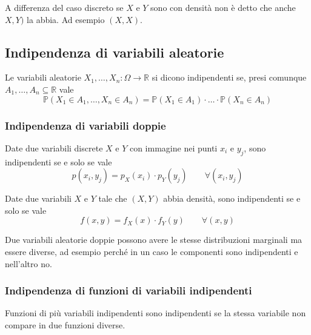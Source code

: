 \begin{observation}
	A differenza del caso discreto se $X$ e $Y$ sono con densità non è detto che anche $X,Y)$ la abbia. Ad esempio $(X,X)$.
\end{observation}

\subsection{Indipendenza di variabili aleatorie}
\begin{definition}
	Le variabili aleatorie $X_1, \ldots, X_n:\Omega \to \mathbb{R}$ si dicono indipendenti se, presi comunque $A_1, \ldots, A_n \subseteq \mathbb{R}$ vale
	\begin{equation}
		\mathbb{P}(X_1 \in A_1, \ldots, X_n \in A_n) = \mathbb{P}(X_1 \in A_1) \cdot \ldots \cdot \mathbb{P}(X_n \in A_n)
	\end{equation} 
\end{definition}

\subsubsection{Indipendenza di variabili doppie}
\begin{proposition}
	Date due variabili discrete $X$ e $Y$ con immagine nei punti $x_i$ e $y_j$, sono indipendenti se e solo se vale
	\begin{equation}
		p(x_i, y_j) = p_X(x_i) \cdot p_Y(y_j) \quad\quad \forall(x_i, y_j)
	\end{equation}
\end{proposition}

\begin{proposition}
	Date due variabili $X$ e $Y$ tale che $(X,Y)$ abbia densità, sono indipendenti se e solo se vale
	\begin{equation}
		f(x,y) = f_X(x) \cdot f_Y(y) \quad\quad \forall(x,y)
	\end{equation}
\end{proposition}

\begin{observation}
	Due variabili aleatorie doppie possono avere le stesse distribuzioni marginali ma essere diverse, ad esempio perché in un caso le componenti sono indipendenti e nell'altro no.
\end{observation}

\subsubsection{Indipendenza di funzioni di variabili indipendenti}
Funzioni di più variabili indipendenti sono indipendenti se la stessa variabile non compare in due funzioni diverse.


